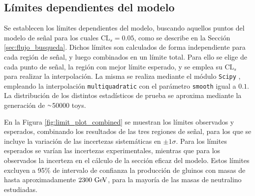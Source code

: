 \subsection{Límites dependientes del modelo}


Se establecen los límites dependientes del modelo, buscando aquellos puntos del modelo de señal para los cuales $\text{CL}_{s}=0.05$, como se describe en la Sección \ref{sec:flujo_busqueda}. Dichos límites son calculados de forma independiente para cada región de señal, y luego combinados en un límite total. Para ello se elige de cada punto de señal, la región con mejor límite esperado, y se emplea su $\text{CL}_{s}$ para realizar la interpolación. La misma se realiza mediante el módulo \texttt{Scipy} \cite{Virtanen:2019joe}, empleando la interpolación \texttt{multiquadratic} con el parámetro \texttt{smooth} igual a $0.1$. La distribución de los distintos estadísticos de prueba se aproxima mediante la generación de {$\smallsim$}50000 toys.

En la Figura \ref{fig:limit_plot_combined} se muestran los límites observados y esperados, combinando los resultados de las tres regiones de señal, para los que se incluye la variación de las incertezas sistemáticas en $\pm1\sigma$. Para los límites esperados se varían las incertezas experimentales, mientras que para los observados la incerteza en el cálculo de la sección eficaz del modelo. Estos límites excluyen a 95\% de intervalo de confianza la producción de gluinos con masas de hasta aproximadamente $2300\ \text{GeV}$, para la mayoría de las masas de neutralino estudiadas. 


